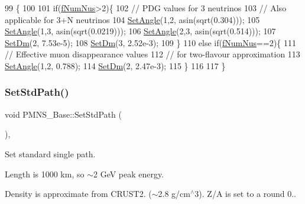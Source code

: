\begin{DoxyCode}
99 \{
100 
101   \textcolor{keywordflow}{if}(\hyperlink{classOscProb_1_1PMNS__Base_a24bb74bed63569dfe88b18fa6a08060e}{fNumNus}>2)\{
102     \textcolor{comment}{// PDG values for 3 neutrinos}
103     \textcolor{comment}{// Also applicable for 3+N neutrinos}
104     \hyperlink{classOscProb_1_1PMNS__Base_ace7875cf6d3bec161a2b7ed2690aec34}{SetAngle}(1,2, asin(sqrt(0.304)));
105     \hyperlink{classOscProb_1_1PMNS__Base_ace7875cf6d3bec161a2b7ed2690aec34}{SetAngle}(1,3, asin(sqrt(0.0219)));
106     \hyperlink{classOscProb_1_1PMNS__Base_ace7875cf6d3bec161a2b7ed2690aec34}{SetAngle}(2,3, asin(sqrt(0.514)));
107     \hyperlink{classOscProb_1_1PMNS__Base_a492243b22fb1b783cd2943f507cff970}{SetDm}(2, 7.53e-5);
108     \hyperlink{classOscProb_1_1PMNS__Base_a492243b22fb1b783cd2943f507cff970}{SetDm}(3, 2.52e-3);
109   \}
110   \textcolor{keywordflow}{else} \textcolor{keywordflow}{if}(\hyperlink{classOscProb_1_1PMNS__Base_a24bb74bed63569dfe88b18fa6a08060e}{fNumNus}==2)\{
111     \textcolor{comment}{// Effective muon disappearance values}
112     \textcolor{comment}{// for two-flavour approximation}
113     \hyperlink{classOscProb_1_1PMNS__Base_ace7875cf6d3bec161a2b7ed2690aec34}{SetAngle}(1,2, 0.788);
114     \hyperlink{classOscProb_1_1PMNS__Base_a492243b22fb1b783cd2943f507cff970}{SetDm}(2, 2.47e-3);
115   \}
116 
117 \}
\end{DoxyCode}
\mbox{\label{classOscProb_1_1PMNS__Base_add6533a9fc9acdfc7ae258b62570d78d}} 
\subsubsection{\texorpdfstring{Set\+Std\+Path()}{SetStdPath()}}
{\footnotesize\ttfamily void P\+M\+N\+S\+\_\+\+Base\+::\+Set\+Std\+Path (\begin{DoxyParamCaption}{ }\end{DoxyParamCaption})\hspace{0.3cm}{\ttfamily [virtual]}, {\ttfamily [inherited]}}

Set standard single path.

Length is 1000 km, so $\sim$2 GeV peak energy.

Density is approximate from C\+R\+U\+S\+T2. ($\sim$2.8 g/cm$^\wedge$3). Z/A is set to a round 0.. 

